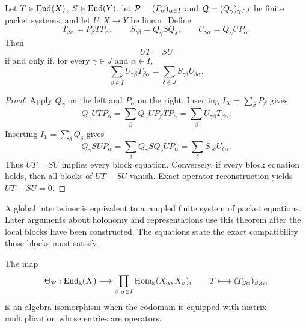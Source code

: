 \begin{theorem}
\label{thm:block-intertwining}
Let \(T\in\operatorname{End}(X)\), \(S\in\operatorname{End}(Y)\), let \(\mathcal P=(P_\alpha)_{\alpha\in I}\) and \(\mathcal Q=(Q_\gamma)_{\gamma\in J}\) be finite packet systems, and let \(U:X\to Y\) be linear.  Define
\[
T_{\beta\alpha}=P_\beta TP_\alpha,
\qquad
S_{\gamma\delta}=Q_\gamma SQ_\delta,
\qquad
U_{\gamma\alpha}=Q_\gamma UP_\alpha.
\]
Then
\[
\boxed{UT=SU}
\]
if and only if, for every \(\gamma\in J\) and \(\alpha\in I\),
\[
\boxed{
\sum_{\beta\in I}U_{\gamma\beta}T_{\beta\alpha}
=
\sum_{\delta\in J}S_{\gamma\delta}U_{\delta\alpha}.
}
\]
\end{theorem}

\begin{proof}
Apply \(Q_\gamma\) on the left and \(P_\alpha\) on the right.  Inserting \(I_X=\sum_\beta P_\beta\) gives
\[
Q_\gamma UTP_\alpha
=
\sum_\beta Q_\gamma UP_\beta TP_\alpha
=
\sum_\beta U_{\gamma\beta}T_{\beta\alpha}.
\]
Inserting \(I_Y=\sum_\delta Q_\delta\) gives
\[
Q_\gamma SUP_\alpha
=
\sum_\delta Q_\gamma SQ_\delta UP_\alpha
=
\sum_\delta S_{\gamma\delta}U_{\delta\alpha}.
\]
Thus \(UT=SU\) implies every block equation.  Conversely, if every block equation holds, then all blocks of \(UT-SU\) vanish.  Exact operator reconstruction yields \(UT-SU=0\).
\end{proof}

\begin{interpretation}
A global intertwiner is equivalent to a coupled finite system of packet equations.  Later arguments about holonomy and representations use this theorem after the local blocks have been constructed.  The equations state the exact compatibility those blocks must satisfy.
\end{interpretation}


\begin{theorem}
\label{thm:block-algebra}
The map
\[
\Theta_{\mathcal P}:\operatorname{End}_{\Bbbk}(X)
\longrightarrow
\prod_{\beta,\alpha\in I}\operatorname{Hom}_{\Bbbk}(X_\alpha,X_\beta),
\qquad
T\longmapsto(T_{\beta\alpha})_{\beta,\alpha},
\]
is an algebra isomorphism when the codomain is equipped with matrix multiplication whose entries are operators.
\end{theorem}


